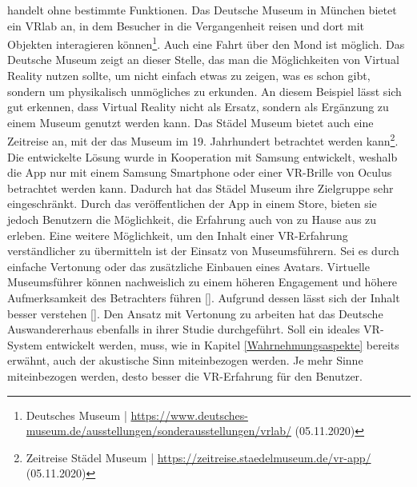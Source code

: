 \documentclass[a4paper,12pt,oneside]{article}
\begin{document}
        handelt ohne bestimmte Funktionen.
        Das Deutsche Museum in München bietet ein VRlab an, in dem Besucher in die Vergangenheit
        reisen und dort mit Objekten interagieren können\footnote{Deutsches Museum | \url{https://www.deutsches-museum.de/ausstellungen/sonderausstellungen/vrlab/} (05.11.2020)}.
        Auch eine Fahrt über den Mond ist möglich. Das Deutsche Museum zeigt an dieser Stelle,
        das man die Möglichkeiten von Virtual Reality nutzen sollte, um nicht einfach etwas
        zu zeigen, was es schon gibt, sondern um physikalisch unmögliches zu erkunden. An 
        diesem Beispiel lässt sich gut erkennen, dass Virtual Reality nicht als Ersatz, sondern
        als Ergänzung zu einem Museum genutzt werden kann.
        Das Städel Museum bietet auch eine Zeitreise an, mit der das Museum im 19. Jahrhundert
        betrachtet werden kann\footnote{Zeitreise Städel Museum | \url{https://zeitreise.staedelmuseum.de/vr-app/} (05.11.2020)}.
        Die entwickelte Lösung wurde in Kooperation mit Samsung entwickelt, weshalb die App
        nur mit einem Samsung Smartphone oder einer VR-Brille von Oculus betrachtet werden
        kann. Dadurch hat das Städel Museum ihre Zielgruppe sehr eingeschränkt. Durch
        das veröffentlichen der App in einem Store, bieten sie jedoch Benutzern die 
        Möglichkeit, die Erfahrung auch von zu Hause aus zu erleben.
        Eine weitere Möglichkeit, um den Inhalt einer VR-Erfahrung verständlicher zu übermitteln
        ist der Einsatz von Museumsführern. Sei es durch einfache Vertonung oder das zusätzliche
        Einbauen eines Avatars. Virtuelle Museumsführer können nachweislich zu einem höheren
        Engagement und höhere Aufmerksamkeit des Betrachters führen [\cite[299]{Carrozzino2018}].
        Aufgrund dessen lässt sich der Inhalt besser verstehen [\cite[300]{Carrozzino2018}].
        Den Ansatz mit Vertonung zu arbeiten hat das Deutsche Auswandererhaus ebenfalls in
        ihrer Studie durchgeführt.
        Soll ein ideales VR-System entwickelt werden, muss, wie in Kapitel \ref{Wahrnehmungsaspekte}
        bereits erwähnt, auch der akustische Sinn miteinbezogen werden. Je mehr Sinne miteinbezogen
        werden, desto besser die VR-Erfahrung für den Benutzer.
\end{document}
